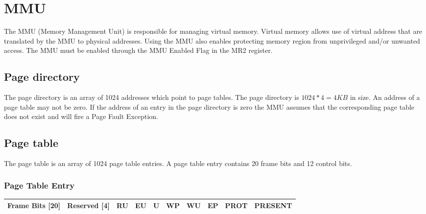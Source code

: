 \section{MMU}

The MMU (Memory Management Unit) is responsible for managing virtual memory. Virtual memory allows use of virtual address that are translated
by the MMU to physical addresses. Using the MMU also enables protecting memory region from unprivileged and/or unwanted access. The MMU must be enabled
through the MMU Enabled Flag in the MR2 register. 

\subsection{Page directory}

The page directory is an array of 1024 addresses which point to page tables. The page directory is $1024 * 4 = 4KB$ in size. An address
of a page table may not be zero. If the address of an entry in the page directory is zero the MMU assumes that the corresponding page table does
not exist and will fire a Page Fault Exception. 

\subsection{Page table}

The page table is an array of 1024 page table entries. A page table entry contains 20 frame bits and 12 control bits.

\subsubsection{Page Table Entry}

\begin{tabular}{ | r | r | r | r | r | r | r | r | r | r | }
	\hline
	Frame Bits [20] & Reserved [4] & RU & EU & U & WP & WU & EP & PROT & PRESENT \\
	\hline
\end{tabular} \\


